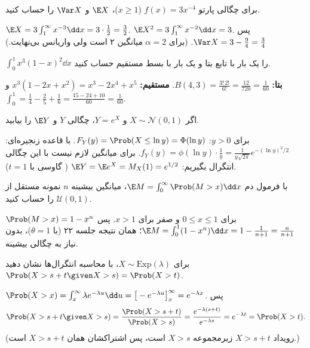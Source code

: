 \begin{exercise}[پارتو با $\alpha=3$]
برای چگالی پارتو $f(x)=3x^{-4}$ ($x\ge1$)، $\E X$ و $\Var X$ را حساب کنید.
\end{exercise}
\begin{solution}
$\E X=3\int_1^\infty x^{-3}\dd x=3\cdot\frac12=\frac32$. $\E X^2=3\int_1^\infty x^{-2}\dd x=3$. پس $\Var X=3-\frac94=\frac34$. (برای $\alpha=2$ میانگین ۲ است ولی واریانس بی‌نهایت.)
\end{solution}

\begin{exercise}
$\int_0^1x^3(1-x)^2\dd x$ را یک بار با تابع بتا و یک بار با بسط مستقیم حساب کنید.
\end{exercise}
\begin{solution}
\textbf{بتا:} $B(4,3)=\frac{3!\,2!}{6!}=\frac{12}{720}=\frac1{60}$.
\textbf{مستقیم:} $x^3(1-2x+x^2)=x^3-2x^4+x^5$ و $\int_0^1=\frac14-\frac25+\frac16=\frac{15-24+10}{60}=\frac1{60}$.
\end{solution}

\begin{exercise}
اگر $X\sim\mathcal N(0,1)$ و $Y=e^X$، چگالی $Y$ و $\E Y$ را بیابید.
\end{exercise}
\begin{solution}
برای $y>0$: $F_Y(y)=\Prob(X\le\ln y)=\Phi(\ln y)$. با قاعده زنجیره‌ای: $f_Y(y)=\phi(\ln y)\cdot\frac1y=\frac{1}{y\sqrt{2\pi}}e^{-(\ln y)^2/2}$. برای میانگین لازم نیست با این چگالی انتگرال بگیریم: $\E Y=\E e^{X}=M_X(1)=e^{1/2}$ ( گاوسی با $t=1$).
\end{solution}

\begin{exercise}
با فرمول دم $\E M=\int_0^\infty\Prob(M>x)\dd x$، میانگین بیشینه $n$ نمونه مستقل از $\mathcal U(0,1)$ را حساب کنید.
\end{exercise}
\begin{solution}
$\Prob(M>x)=1-x^n$ برای $0\le x\le1$ و صفر برای $x>1$. پس $\E M=\int_0^1(1-x^n)\dd x=1-\frac{1}{n+1}=\frac{n}{n+1}$؛ همان نتیجه جلسه ۲۲ (با $\theta=1$)، بدون نیاز به چگالی بیشینه.
\end{solution}

\begin{exercise}
برای $X\sim\mathrm{Exp}(\lambda)$، با محاسبه انتگرال‌ها نشان دهید $\Prob(X>s+t\given X>s)=\Prob(X>t)$.
\end{exercise}
\begin{solution}
$\Prob(X>x)=\int_x^\infty\lambda e^{-\lambda u}\dd u=\big[-e^{-\lambda u}\big]_x^\infty=e^{-\lambda x}$. پس
\[
\Prob(X>s+t\given X>s)=\frac{\Prob(X>s+t)}{\Prob(X>s)}=\frac{e^{-\lambda(s+t)}}{e^{-\lambda s}}=e^{-\lambda t}=\Prob(X>t).
\]
(رویداد $X>s+t$ زیرمجموعه $X>s$ است، پس اشتراکشان همان $X>s+t$ است.)
\end{solution}

